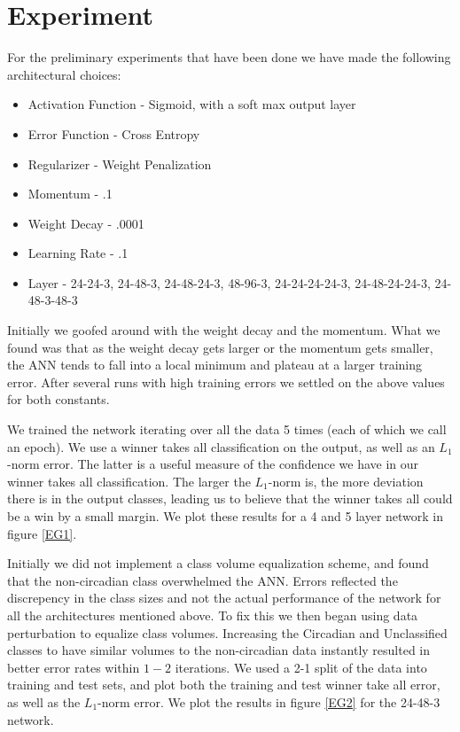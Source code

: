 \documentclass[prl,amsmath,amssymb,floatfix,superscriptaddress,notitlepage,twocolumn]{revtex4}
\begin{document}
\section{Experiment}

For the preliminary experiments that have been done we have made the following architectural choices:
\begin{itemize}
\item Activation Function - Sigmoid, with a soft max output layer
\item Error Function - Cross Entropy
\item Regularizer - Weight Penalization
\item Momentum - .1
\item Weight Decay - .0001
\item Learning Rate - .1
\item Layer - {24-24-3, 24-48-3, 24-48-24-3, 48-96-3, 24-24-24-24-3, 24-48-24-24-3, 24-48-3-48-3 } 
\end{itemize}

Initially we goofed around with the weight decay and the momentum. What we found was that as the weight decay gets larger or the momentum gets smaller, the ANN tends to fall into a local minimum and plateau at a larger training error. After several runs with high training errors we settled on the above values for both constants.

We trained the network iterating over all the data 5 times (each of which we call an epoch). We use a winner takes all classification on the output, as well as an $L_1$-norm error. The latter is a useful measure of the confidence we have in our winner takes all classification. The larger the $L_1$-norm is, the more deviation there is in the output classes, leading us to believe that the winner takes all could be a win by a small margin. We plot these results for a 4 and 5 layer network in figure \ref{EG1}.

Initially we did not implement a class volume equalization scheme, and found that the non-circadian class overwhelmed the ANN. Errors reflected the discrepency in the class sizes and not the actual performance of the network for all the architectures mentioned above. To fix this we then began using data perturbation to equalize class volumes. Increasing the Circadian and Unclassified classes to have similar volumes to the non-circadian data instantly resulted in better error rates within $1-2$ iterations. We used a 2-1 split of the data into training and test sets, and plot both the training and test winner take all error, as well as the $L_1$-norm error. We plot the results in figure \ref{EG2} for the 24-48-3 network. 
\end{document}
